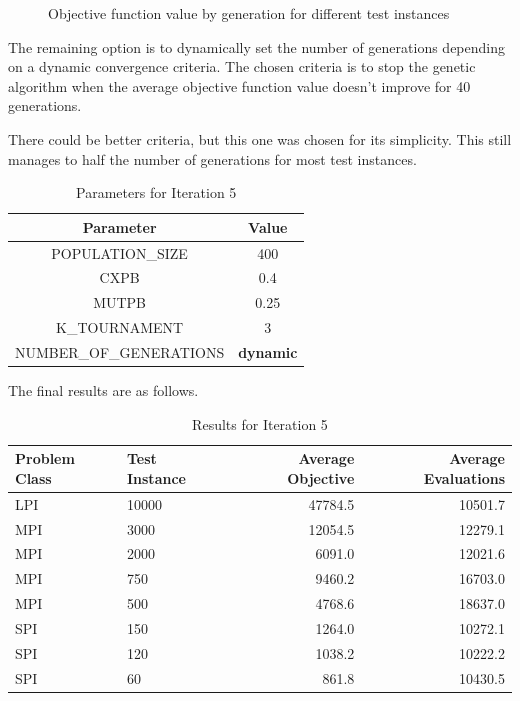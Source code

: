 \begin{figure}[h]
    \caption{Objective function value by generation for different test instances}
    \label{fig:performance_plots_it5}
\end{figure}
\FloatBarrier

The remaining option is to dynamically set the number of generations depending on a dynamic convergence criteria. The chosen criteria is to stop the genetic algorithm when the average objective function value doesn't improve for 40 generations.

There could be better criteria, but this one was chosen for its simplicity. This still manages to half the number of generations for most test instances.

\begin{table}[h]
    \centering
    \begin{tabular}{|c c|}
        \hline
        \textbf{Parameter} & \textbf{Value} \\
        \hline
        POPULATION\_SIZE & 400 \\
        CXPB & 0.4 \\
        MUTPB & 0.25 \\
        K\_TOURNAMENT & 3 \\
        NUMBER\_OF\_GENERATIONS & \textbf{dynamic} \\
        \hline
    \end{tabular}
    \caption{Parameters for Iteration 5}
    \label{tab:iteration1_parameters}
\end{table}

The final results are as follows.

\begin{table}[h]
    \centering
    \begin{tabular}{|l l r r|}
        \hline
        \textbf{Problem Class} & \textbf{Test Instance} & \textbf{Average Objective} & \textbf{Average Evaluations} \\
        \hline
        LPI	& 10000	& 47784.5	& 10501.7 \\
        MPI	& 3000	& 12054.5	& 12279.1 \\
        MPI	& 2000	& 6091.0	& 12021.6 \\
        MPI	& 750	& 9460.2	& 16703.0 \\
        MPI	& 500	& 4768.6	& 18637.0 \\
        SPI	& 150	& 1264.0	& 10272.1 \\
        SPI	& 120	& 1038.2	& 10222.2 \\
        SPI	& 60	& 861.8     & 10430.5 \\
        \hline
    \end{tabular}
    \caption{Results for Iteration 5}
    \label{tab:gen_objective_summary}
\end{table}


